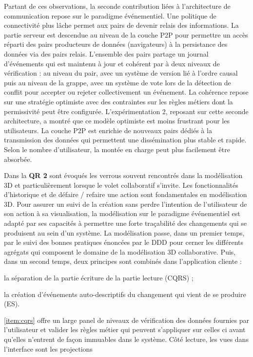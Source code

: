 Partant de ces observations, la seconde contribution liées à l'architecture de 
communication repose sur le paradigme événementiel. Une politique de 
connectivité plus lâche permet aux pairs de devenir relais des informations. La 
partie serveur est \og descendue\fg{} au niveau de la couche \gls{P2P} pour 
permettre un accès réparti des pairs producteurs de données (navigateurs) à la
persistance des données via des pairs relais. L'ensemble des pairs partage un 
journal d'événements qui est maintenu à jour et cohérent par à deux niveaux de 
vérification : au niveau du pair, avec un système de version lié à l'ordre causal 
puis au niveau de la grappe, avec un système de vote lors de la détection de 
conflit pour accepter ou rejeter collectivement un événement. La cohérence repose 
sur une stratégie optimiste avec des contraintes sur les règles métiers dont la 
permissivité peut être configurée.
L'expérimentation 2, reposant sur cette seconde architecture, a montré que ce 
modèle optimiste est moins frustrant pour les utilisateurs. La couche \gls{P2P} est 
enrichie de nouveaux pairs dédiés à la transmission des données qui permettent 
une dissémination plus stable et rapide. Selon le nombre d'utilisateur, la montée 
en charge peut plus facilement être absorbée.



Dans la \textbf{QR 2} sont évoqués les verrous souvent rencontrés dans la 
modélisation 3D et particulièrement lorsque le volet collaboratif s'invite. Les 
fonctionnalités d'historique et de défaire / refaire une action sont fondamentales en 
modélisation 3D. Pour assurer un suivi de la création sans perdre l'intention de 
l'utilisateur de son action à sa visualisation, la modélisation sur le paradigme 
événementiel est adapté par ses capacités à permettre une forte traçabilité des 
changements qui se produisent au sein d'un système. La modélisation passe, 
dans un premier temps, par le suivi des bonnes pratiques énoncées par le 
\gls{DDD} pour cerner les différents agrégats qui composent le domaine de la 
modélisation 3D collaborative. 
Puis, dans un second temps, deux principes sont combinés dans l'application 
cliente : 
\begin{enumerate*}[label=(\roman*)]
	\item \label{item:cqrs}la séparation de la partie écriture de la partie lecture 
	(\gls{CQRS}) ;
	\item \label{item:es} la création d'événements auto-descriptifs du changement 
	qui vient de se 
	produire (\gls{ES}).
\end{enumerate*}
\ref{item:cqrs} offre un large panel de niveaux de vérification des données fournies 
par l'utilisateur 
et valider les règles métier qui peuvent s'appliquer sur celles ci avant qu'elles 
n'entrent de façon immuables dans le système. Côté lecture, les vues dans 
l'interface sont les projections 

